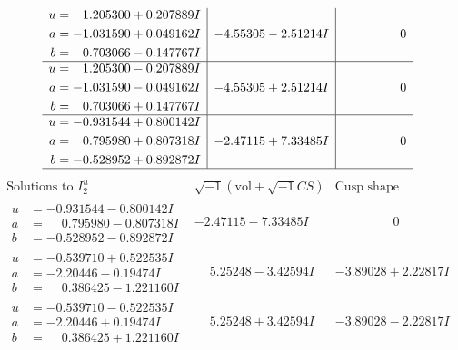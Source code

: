 \documentclass[1p]{elsarticle_modified}
\theoremstyle{definition}
\newcommand{\I}{\sqrt{-1}}
\begin{document}
$$\begin{array}{c|c|c}
\begin{aligned}
u &= \phantom{-}1.205300 + 0.207889 I \\
a &= -1.031590 + 0.049162 I \\
b &= \phantom{-}0.703066 - 0.147767 I\end{aligned}
 & -4.55305 - 2.51214 I & \phantom{-0.000000 } 0 \\ \hline\begin{aligned}
u &= \phantom{-}1.205300 - 0.207889 I \\
a &= -1.031590 - 0.049162 I \\
b &= \phantom{-}0.703066 + 0.147767 I\end{aligned}
 & -4.55305 + 2.51214 I & \phantom{-0.000000 } 0 \\ \hline\begin{aligned}
u &= -0.931544 + 0.800142 I \\
a &= \phantom{-}0.795980 + 0.807318 I \\
b &= -0.528952 + 0.892872 I\end{aligned}
 & -2.47115 + 7.33485 I & \phantom{-0.000000 } 0\\
 \hline 
 \end{array}$$\newpage$$\begin{array}{c|c|c}  
\text{Solutions to }I^u_{2}& \I (\text{vol} + \sqrt{-1}CS) & \text{Cusp shape}\\
 \hline 
\begin{aligned}
u &= -0.931544 - 0.800142 I \\
a &= \phantom{-}0.795980 - 0.807318 I \\
b &= -0.528952 - 0.892872 I\end{aligned}
 & -2.47115 - 7.33485 I & \phantom{-0.000000 } 0 \\ \hline\begin{aligned}
u &= -0.539710 + 0.522535 I \\
a &= -2.20446 - 0.19474 I \\
b &= \phantom{-}0.386425 - 1.221160 I\end{aligned}
 & \phantom{-}5.25248 - 3.42594 I & -3.89028 + 2.22817 I \\ \hline\begin{aligned}
u &= -0.539710 - 0.522535 I \\
a &= -2.20446 + 0.19474 I \\
b &= \phantom{-}0.386425 + 1.221160 I\end{aligned}
 & \phantom{-}5.25248 + 3.42594 I & -3.89028 - 2.22817 I \\ \hline\begin{aligned}

\end{aligned}
\end{array}$$
\end{document}
